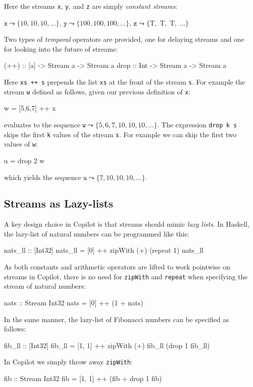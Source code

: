 \documentclass[]{article}
\theoremstyle{example}
\begin{document}
\noindent Here the streams {\tt x}, {\tt y}, and {\tt z} are simply
\emph{constant streams}:

\begin{center}
$\mathtt{x} \leadsto \{10, 10, 10, \dots \}$,
$\mathtt{y} \leadsto \{100, 100, 100,  \dots \}$,
$\mathtt{z} \leadsto \{\mbox{T},\; \mbox{T},\; \mbox{T},\; \dots \}$
\end{center}

Two types of \emph{temporal} operators are provided, one for delaying streams and one for
looking into the future of streams:
%
\begin{code}
(++) :: [a] -> Stream a -> Stream a
drop :: Int -> Stream a -> Stream a
\end{code}
%
Here {\tt xs ++ s} prepends the list {\tt xs} at the front of the stream {\tt s}.
For example the stream {\tt w} defined as follows, given our previous definition
of {\tt x}:
%
\begin{code}
w = [5,6,7] ++ x
\end{code}
%
evaluates to the sequence
$\mathtt{w} \leadsto \{5, 6, 7, 10, 10, 10, \dots\}$.
The expression {\tt drop k s} skips the first {\tt k} values of the stream {\tt s}.
For example we can skip the first two values of {\tt w}:
%
\begin{code}
u = drop 2 w
\end{code}
%
which yields the sequence
$\mathtt{u} \leadsto \{7, 10, 10, 10, \dots\}$.

\subsection{Streams as Lazy-lists}

A key design choice in Copilot is that streams should mimic \emph{lazy lists}.
In Haskell, the lazy-list of natural numbers can be programmed like this:
%
\begin{code}
nats_ll :: [Int32]
nats_ll = [0] ++ zipWith (+) (repeat 1) nats_ll
\end{code}
%
As both constants and arithmetic operators are lifted to work pointwise on
streams in Copilot, there is no need for {\tt zipWith} and {\tt repeat} when
specifying the stream of natural numbers:
%
\begin{code}
nats :: Stream Int32
nats = [0] ++ (1 + nats)
\end{code}
%
In the same manner, the lazy-list of Fibonacci numbers can be specified as follows:
%
\begin{code}
fib_ll :: [Int32]
fib_ll = [1, 1] ++ zipWith (+) fib_ll (drop 1 fib_ll)
\end{code}
%
In Copilot we simply throw away {\tt zipWith}:
\begin{code}
fib :: Stream Int32
fib = [1, 1] ++ (fib + drop 1 fib)
\end{code}
\end{document}
